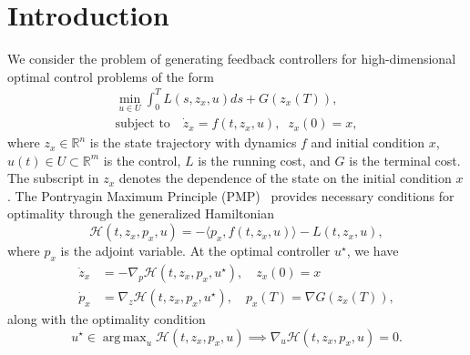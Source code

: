 \documentclass[letterpaper, 10 pt, conference]{ieeeconf}  %
\DeclareMathOperator*{\argmax}{arg\,max}
\newcommand{\R}{\mathbb{R}}
\begin{document}
    \section{Introduction}\label{sec: intro}
    We consider the problem of generating feedback controllers for high-dimensional optimal control problems of the form 
    \begin{equation}
        \begin{split}
        \min_{u \in U} \int_0^T L(s, z_{x}, u) ds + G(z_{x}(T)), \\ \text{subject to} \quad \dot{z}_{x} = f(t, z_{x},u), \;\; z_{x}(0) = x,
        \end{split}
        \label{eq:originalOC}
    \end{equation}
    where $z_x\in \R^n$   is the state trajectory with dynamics $f$ and initial condition $x$, $u(t)\in U\subset \R^m$ is the control, $L$ is the running cost, and $G$ is the terminal cost. The subscript in  $z_{x}$ denotes the dependence of the state on the initial condition $x$. 
    The Pontryagin Maximum Principle (PMP)~\cite{pontryagin2018mathematical, kopp1962pontryagin} provides necessary conditions for optimality through the generalized Hamiltonian
    \begin{equation}
        \mathcal{H}(t,z_{x},p_{x}, u) = - \langle p_{x}, f(t,z_{x},u) \rangle - L(t,z_{x},u),
    \end{equation}
    where $p_{x}$ is the adjoint variable. 
    At the optimal controller $u^\star$, we have 
    \begin{align}
        \dot{z}_{x} &= -\nabla_p \mathcal{H}(t,z_{x}, p_{x} , u^\star), \quad z_{x}(0) = x \\
        \dot{p}_{x} &= \nabla_z \mathcal{H}(t,z_{x}, p_{x}, u^\star), \quad p_{x}(T) = \nabla G(z_{x}(T)), \label{eq:adjoint_dyn}
    \end{align}
    along with the optimality condition
    \begin{equation}
        u^\star \in  \argmax_u \mathcal{H}(t,z_{x},p_{x}, u) \implies \nabla_u \mathcal{H}(t,z_{x}, p_{x}, u) = 0.
        \label{eq:u_star_def_general}
    \end{equation}
    
\end{document}
